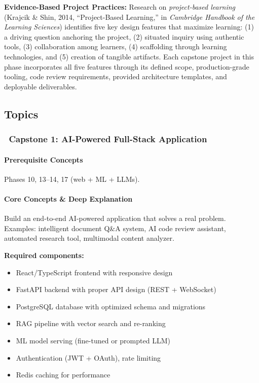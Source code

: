 \documentclass[11pt, a4paper, oneside]{report}
\newcommand{\mustmaster}[1]{\subsubsection{\texorpdfstring{\fcolorbox{blue!40!black}{blue!8}{\footnotesize\bfseries\color{blue!40!black} MUST MASTER}~#1}{#1}}}
\begin{document}
\textbf{Evidence-Based Project Practices:} Research on \emph{project-based learning} (Krajcik \& Shin, 2014, ``Project-Based Learning,'' in \emph{Cambridge Handbook of the Learning Sciences}) identifies five key design features that maximize learning: (1) a driving question anchoring the project, (2) situated inquiry using authentic tools, (3) collaboration among learners, (4) scaffolding through learning technologies, and (5) creation of tangible artifacts. Each capstone project in this phase incorporates all five features through its defined scope, production-grade tooling, code review requirements, provided architecture templates, and deployable deliverables.


\subsection*{Topics}

\mustmaster{Capstone 1: AI-Powered Full-Stack Application}

\paragraph{Prerequisite Concepts} Phases 10, 13--14, 17 (web + ML + LLMs).

\paragraph{Core Concepts \& Deep Explanation} Build an end-to-end AI-powered application that solves a real problem. Examples: intelligent document Q\&A system, AI code review assistant, automated research tool, multimodal content analyzer.

\textbf{Required components:}
\begin{itemize}[leftmargin=*]
\item React/TypeScript frontend with responsive design
\item FastAPI backend with proper API design (REST + WebSocket)
\item PostgreSQL database with optimized schema and migrations
\item RAG pipeline with vector search and re-ranking
\item ML model serving (fine-tuned or prompted LLM)
\item Authentication (JWT + OAuth), rate limiting
\item Redis caching for performance
\end{itemize}
\end{document}
